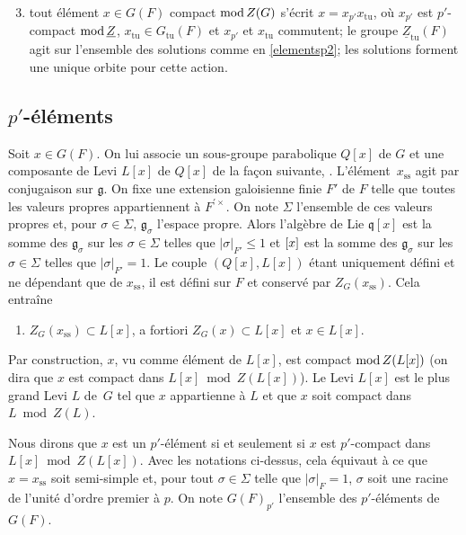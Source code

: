 \documentclass[JEP,XML,SOM,Unicode,francais]{cedram}
\newcommand{\NoChangel}[1]{%
\expandafter\let\csname old\string#1\endcsname=#1
\let#1=\relax
\newcommand{#1}{\mathcode`l="716C\csname old\string#1\endcsname\mathcode`l="7160 }%
}
\newcommand{\rmod}{\textup{mod}\,}
\newcommand{\frg}{\mathfrak{g}}
\newcommand{\frl}{\mathfrak{l}}\NoChangel{\frl}
\newcommand{\mfrq}{\mathfrak{q}}
\newcommand{\rss}{\mathrm{ss}}
\newcommand{\tu}{\mathrm{tu}}
\theoremstyle{plain}
\theoremstyle{definition}
\begin{document}
\begin{enumerate}\setcounter{enumi}{2}
\item\label{elementsp3}
tout élément $x\in G(F)$ compact $\rmod Z(G)$ s'écrit $x=x_{p'}x_{\tu}$, où $x_{p'}$ est $p'$\nobreakdash-compact $\rmod \underline{Z}$, $x_{\tu}\in G_{\tu}(F)$ et $x_{p'}$ et $x_{\tu}$ commutent; le groupe $\underline{Z}_{\tu}(F)$ agit sur l'ensemble des solutions comme en \eqref{elementsp2}; les solutions forment une unique orbite pour cette action.
\end{enumerate}

\subsection{\texorpdfstring{$p'$}{p'}-éléments}\label{pelements}

Soit $x\in G(F)$. On lui associe un sous-groupe parabolique $Q[x]$ de $G$ et une composante de Levi $L[x]$ de $Q[x]$ de la façon suivante, \cf \cite{C}. L'élément~$x_{\rss}$ agit par conjugaison sur $\frg$. On fixe une extension galoisienne finie $F'$ de $F$ telle que toutes les valeurs propres appartiennent à $F^{\prime\times}$. On note $\Sigma$ l'ensemble de ces valeurs propres et, pour $\sigma\in \Sigma$, $\frg_{\sigma}$ l'espace propre. Alors l'algèbre de Lie $\mfrq[x]$ est la somme des $\frg_{\sigma}$ sur les $\sigma\in \Sigma$ telles que $\vert \sigma\vert _{F'}\leq 1$ et $\frl[x]$ est la somme des $\frg_{\sigma}$ sur les $\sigma\in \Sigma$ telles que $\vert \sigma\vert _{F'}= 1$.
Le couple $(Q[x], L[x])$ étant uniquement défini et ne dépendant que de $x_{\rss}$, il est défini sur $F$ et conservé par $Z_{G}(x_{\rss})$. Cela entraîne
\begin{enumerate}
\item\label{pelements1}
$Z_{G}(x_{\rss})\subset L[x]$, a fortiori $Z_{G}(x)\subset L[x]$ et $x\in L[x]$.
\end{enumerate}

Par construction, $x$, vu comme élément de $L[x]$, est compact $\rmod Z(L[x])$ (on dira que $x$ est compact dans $L[x]\bmod Z(L[x])$). Le Levi $L[x]$ est le plus grand Levi $L$ de~$G$ tel que $x$ appartienne à $L$ et que $x$ soit compact dans $L\bmod Z(L)$.

Nous dirons que $x$ est un $p'$-élément si et seulement si $x$ est $p'$-compact dans $L[x]\bmod Z(L[x])$. Avec les notations ci-dessus, cela équivaut à ce que $x=x_{\rss}$ soit semi-simple et, pour tout $\sigma\in \Sigma$ telle que $\vert \sigma\vert _{F}=1$, $\sigma$ soit une racine de l'unité d'ordre premier à $p$. On note $G(F)_{p'}$ l'ensemble des $p'$-éléments de $G(F)$.
\end{document}
